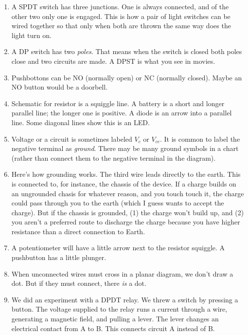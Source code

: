\documentclass[11pt, oneside]{amsart}
\begin{document}
\begin{enumerate}
  \item A SPDT switch has three junctions. One is always connected, and
  of the other two only one is engaged. This is how a pair of light
  switches can be wired together so that only when both are thrown the
  same way does the light turn on.

  \item A DP switch has two \emph{poles}. That means when the switch is
  closed both poles close and two circuits are made. A DPST is what you
  see in movies.

  \item Pushbottons can be NO (normally open) or NC (normally closed).
  Maybe an NO button would be a doorbell.

  \item Schematic for resistor is a squiggle line. A battery is a short
  and longer parallel line; the longer one is positive. A diode is an
  arrow into a parallel line. Some diagonal lines show this is an LED.

  \item Voltage or a circuit is sometimes labeled $V_c$ or $V_{cc}$. It
  is common to label the negative terminal as \emph{ground}. There may
  be many ground symbols in a chart (rather than connect them to the
  negative terminal in the diagram).

  \item Here's how grounding works. The third wire leads directly to the
  earth. This is connected to, for instance, the chassis of the device.
  If a charge builds on an ungrounded chasis for whatever reason, and
  you touch touch it, the charge could pass through you to the earth
  (which I guess wants to accept the charge). But if the chassis is
  grounded, (1) the charge won't build up, and (2) you aren't a
  preferred route to discharge the charge because you have higher
  resistance than a direct connection to Earth.

  \item A potentiometer will have a little arrow next to the resistor
  squiggle. A pushbutton has a little plunger.

  \item When unconnected wires must cross in a planar diagram, we don't
  draw a dot. But if they must connect, there \emph{is} a dot.

  \item We did an experiment with a DPDT relay. We threw a switch by
  pressing a button. The voltage supplied to the relay runs a current
  through a wire, generating a magnetic field, and pulling a lever. The
  lever changes an electrical contact from A to B. This connects circuit
  A instead of B.


\end{enumerate}
\end{document}
